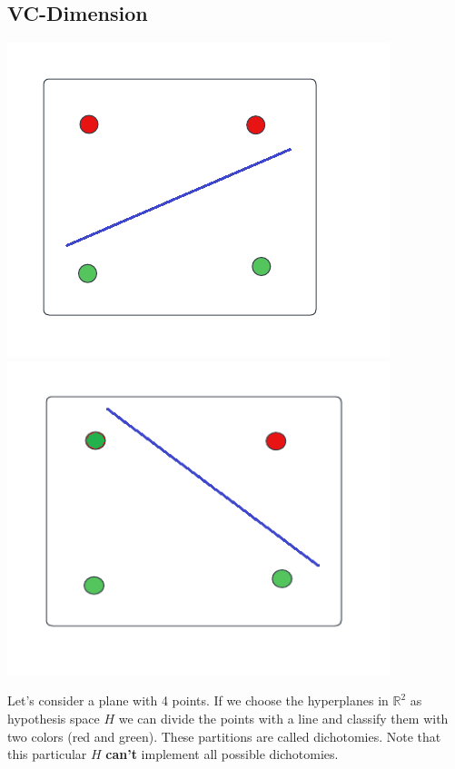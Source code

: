 \subsection{VC-Dimension}
\begin{center}
    \includegraphics{images/Dichotomy 1.png}
    \includegraphics{images/Dichotomy 2.png}
\end{center}
Let's consider a plane with 4 points. If we choose the hyperplanes in $\mathbb{R}^{2}$ as hypothesis space $H$ we can divide the points with a line and classify them with two colors (red and green). These partitions are called dichotomies. Note that this particular $H$ \textbf{can't} implement all possible dichotomies.
